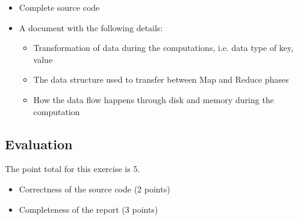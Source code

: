 \begin{itemize}
\item Complete source code
\item A document with the following details:

  \begin{itemize}
  \item	Transformation of data during the computations, i.e. data type of key, value
  \item	The data structure used to transfer between Map and Reduce phases
  \item	How the data flow happens through disk and memory during the computation
  \end{itemize}

\end{itemize}

\subsection*{Evaluation}

The point total for this exercise is 5.

\begin{itemize}
\item Correctness of the source code (2 points)
\item	Completeness of the report (3 points)
\end{itemize}

